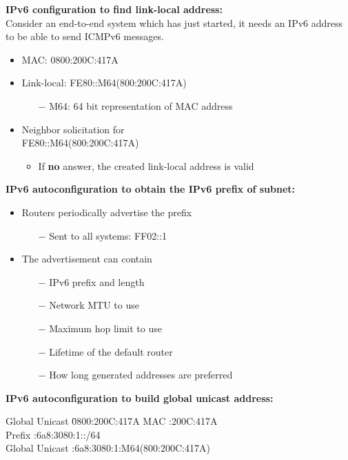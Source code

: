 \documentclass[a4paper, fontsize=8pt, landscape, DIV=1]{scrartcl}
\begin{document}
\begin{multicols*}{4}
		\textbf{IPv6 configuration to find link-local address:}\\
		Consider an end-to-end system which has just started, it needs an IPv6 address to be able to send ICMPv6 messages.
		\begin{itemize}[noitemsep]
			\item MAC: 0800:200C:417A
			\item Link-local: FE80::M64(800:200C:417A)
			\begin{itemize}
				\item[$-$] M64: 64 bit representation of MAC address
			\end{itemize}
			\item Neighbor solicitation for\\ FE80::M64(800:200C:417A)
			\begin{itemize}
				\item If \textbf{no} answer, the created link-local address is valid
			\end{itemize} 
		\end{itemize}	
		\par
		
		\textbf{IPv6 autoconfiguration to obtain the IPv6 prefix of subnet:}
		\vspace{-0.2cm}
		\begin{itemize}[noitemsep]
			\item Routers periodically advertise the prefix
			\begin{itemize}
				\item[$-$] Sent to all systems: FF02::1
			\end{itemize}
			\item The advertisement can contain
			\begin{itemize}
				\item[$-$] IPv6 prefix and length
				\item[$-$] Network MTU to use
				\item[$-$] Maximum hop limit to use
				\item[$-$] Lifetime of the default router
				\item[$-$] How long generated addresses are preferred
			\end{itemize}
		\end{itemize}
		\par 
		
		\textbf{IPv6 autoconfiguration to build global unicast address:}
		\vspace{-0.2cm}
		\begin{tabbing}
			Global Unicast \= 0800:200C:417A \kill
			MAC :200C:417A \\
			Prefix :6a8:3080:1::/64 \\
			Global Unicast :6a8:3080:1:M64(800:200C:417A)
		\end{tabbing}
		

\end{multicols*}
\end{document}
